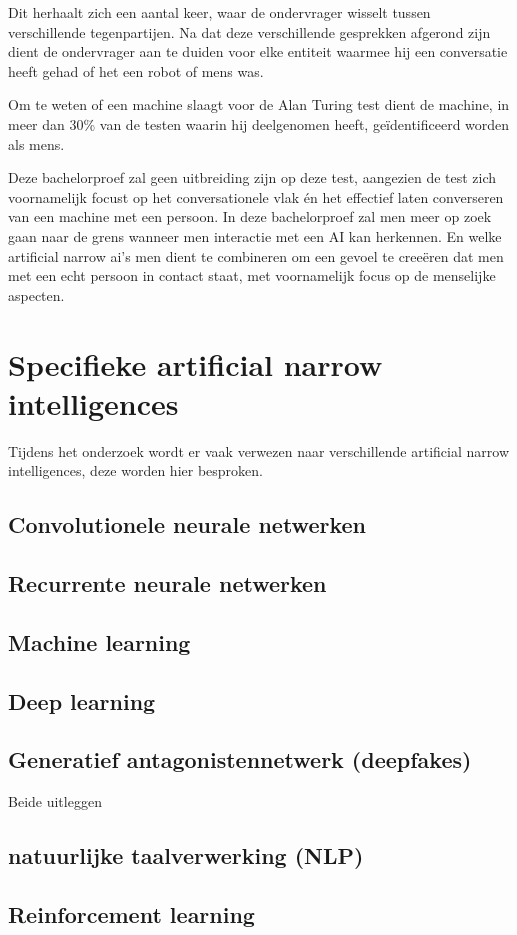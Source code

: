 Dit herhaalt zich een aantal keer, waar de ondervrager wisselt tussen verschillende tegenpartijen. Na dat deze verschillende gesprekken afgerond zijn dient de ondervrager aan te duiden voor elke entiteit waarmee hij een conversatie heeft gehad of het een robot of mens was.

Om te weten of een machine slaagt voor de Alan Turing test dient de machine, in meer dan 30\% van de testen waarin hij deelgenomen heeft, geïdentificeerd worden als mens. 

Deze bachelorproef zal geen uitbreiding zijn op deze test, aangezien de test zich voornamelijk focust op het conversationele vlak én het effectief laten converseren van een machine met een persoon. In deze bachelorproef zal men meer op zoek gaan naar de grens wanneer men interactie met een AI kan herkennen. En welke artificial narrow ai's men dient te combineren om een gevoel te creeëren dat men met een echt persoon in contact staat, met voornamelijk focus op de menselijke aspecten.

\section{Specifieke artificial narrow intelligences}

Tijdens het onderzoek wordt er vaak verwezen naar verschillende artificial narrow intelligences, deze worden hier besproken.

\subsection{Convolutionele neurale netwerken}

\subsection{Recurrente neurale netwerken}

\subsection{Machine learning}

\subsection{Deep learning}

\subsection{Generatief antagonistennetwerk (deepfakes)}

Beide uitleggen

\subsection{natuurlijke taalverwerking (NLP)}

\subsection{Reinforcement learning}


